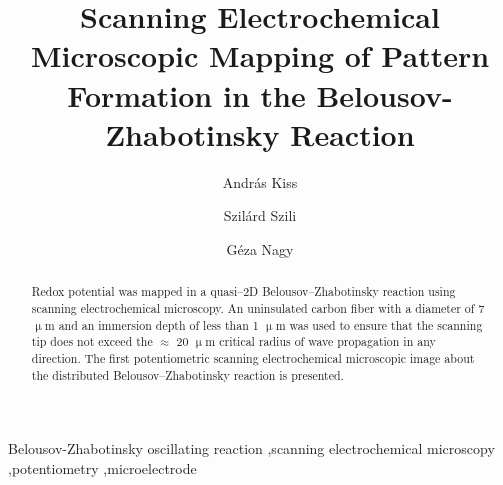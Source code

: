 \documentclass[3p]{elsarticle}
\begin{document}
\begin{frontmatter}

\title{Scanning Electrochemical Microscopic Mapping of Pattern Formation in the Belousov-Zhabotinsky Reaction}
\author[akiss]{András Kiss}
\author[szszilard]{Szilárd Szili}
\address[akiss, gnagy, szszilard]{Department of General and Physical Chemistry, Faculty of Sciences, University of Pécs, 7624 Pécs, Ifjúság útja 6, Hungary}
\address[akiss, gnagy]{János Szentágothai Research Centre, University of Pécs, 7624 Pécs, Ifjúság útja 20, Hungary}
\author[gnagy]{Géza Nagy}

\begin{abstract}

Redox potential was mapped in a quasi--2D Belousov--Zhabotinsky reaction using scanning electrochemical microscopy.
An uninsulated carbon fiber with a diameter of 7 $\upmu$m and an immersion depth of less than 1 $\upmu$m was used to ensure that the scanning tip does not exceed the $\approx$ 20 $\upmu$m critical radius of wave propagation in any direction.
The first potentiometric scanning electrochemical microscopic image about the distributed Belousov--Zhabotinsky reaction is presented. 




\end{abstract}
\begin{keyword}
	Belousov-Zhabotinsky oscillating reaction \sep scanning electrochemical microscopy \sep potentiometry \sep microelectrode
\end{keyword}
\end{frontmatter}
\end{document}
